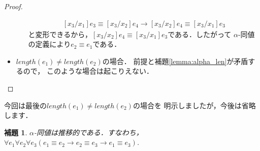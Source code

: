 \documentclass{ltjsbook}%
\newtheorem{lemma}{補題}[section]%
\newcommand\lemmaname{補題}%
\begin{document}
\begin{proof}
\begin{itemize}
\begin{itemize}
    \begin{align}%
    {}[\mathit{x}_3/\mathit{x}_1]\mathit{e}_3%
    \equiv{}[\mathit{x}_3/\mathit{x}_2]\mathit{e}_4\rightarrow%
    {}[\mathit{x}_3/\mathit{x}_2]\mathit{e}_4%
    \equiv{}[\mathit{x}_3/\mathit{x}_1]\mathit{e}_3%
    \end{align}%
    と変形できるから，${}[\mathit{x}_3/\mathit{x}_2]\mathit{e}_4%
    \equiv{}[\mathit{x}_3/\mathit{x}_1]\mathit{e}_3$である．したがって%
    $\alpha$-同値の定義により$\mathit{e}_2\equiv \mathit{e}_1$である．%
  \end{itemize}%
  \item $length(\mathit{e}_1)\neq length(\mathit{e}_2)$の場合．%
    前提と\lemmaname\ref{lemma:alpha_len}が矛盾するので，%
    このような場合は起こりえない．%
  \end{itemize}%
\end{proof}%
今回は最後の$length(\mathit{e}_1)\neq length(\mathit{e}_2)$の場合を%
明示しましたが，今後は省略します．%
\begin{lemma}%
  $\alpha$-同値は推移的である．すなわち，%
  $\forall\mathit{e}_1\forall\mathit{e}_2\forall\mathit{e}_3%
  (\mathit{e}_1\equiv \mathit{e}_2\rightarrow\mathit{e}_2\equiv \mathit{e}_3%
  \rightarrow\mathit{e}_1\equiv \mathit{e}_3)$.%
\end{lemma}%
\end{document}
